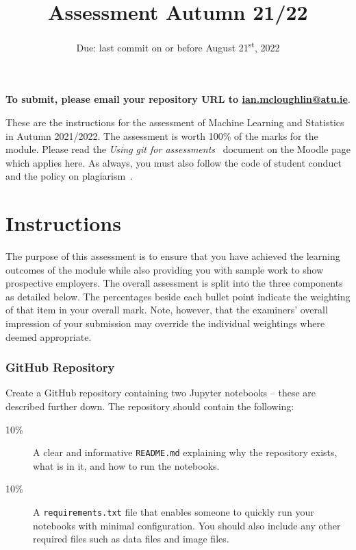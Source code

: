 \documentclass[a4paper, 12pt]{scrartcl}
\title{Assessment Autumn 21/22}
\author{}
\date{Due: last commit on or before August 21\textsuperscript{st}, 2022}
\begin{document}
  
  \maketitle
  
  \vspace{-12mm}
  \begin{center} \textbf{To submit, please email your repository URL to \url{ian.mcloughlin@atu.ie}}. \end{center}


  \noindent These are the instructions for the assessment of Machine Learning and Statistics in Autumn 2021/2022.
  The assessment is worth 100\% of the marks for the module.
  Please read the \emph{Using git for assessments}~\cite{usinggit} document on the Moodle page which applies here.
  As always, you must also follow the code of student conduct and the policy on plagiarism~\cite{gmitqaf}.

  \section*{Instructions}
  
  The purpose of this assessment is to ensure that you have achieved the learning outcomes of the module while also providing you with sample work to show prospective employers.
  The overall assessment is split into the three components as detailed below.
  The percentages beside each bullet point indicate the weighting of that item in your overall mark.
  Note, however, that the examiners' overall impression of your submission may override the individual weightings where deemed appropriate.
  
  \subsubsection*{GitHub Repository}
  Create a GitHub repository containing two Jupyter notebooks -- these are described further down.
  The repository should contain the following:
  \begin{description}
    \item[10\%] A clear and informative \texttt{README.md} explaining why the repository exists, what is in it, and how to run the notebooks.
    \item[10\%] A \texttt{requirements.txt} file that enables someone to quickly run your notebooks with minimal configuration. You should also include any other required files such as data files and image files.
  \end{description}
\end{document}
